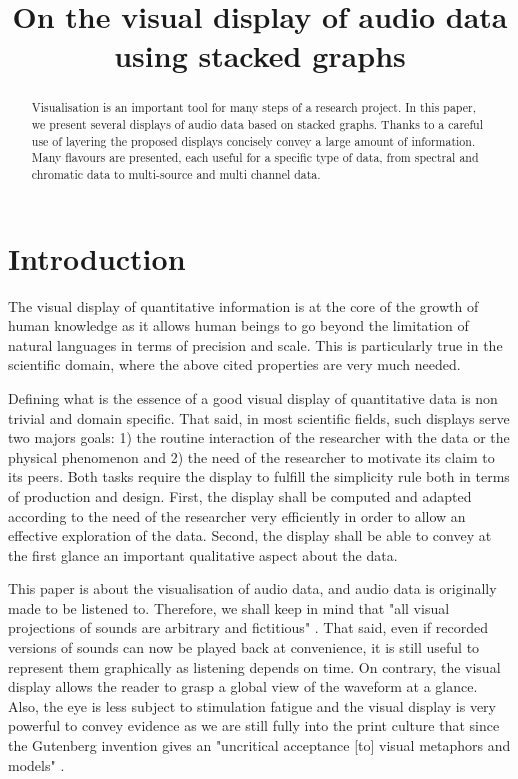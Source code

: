 \documentclass{article}
\title{On the visual display of audio data using stacked graphs}
\begin{document}
%
\maketitle
%
\begin{abstract}
Visualisation is an important tool for many steps of a research project. In this paper, we present several displays of audio data based on stacked graphs. Thanks to a careful use of layering the proposed displays concisely convey a large amount of information. Many flavours are presented, each useful for a specific type of data, from spectral and chromatic data to multi-source and multi channel data.
\end{abstract}
%
\section{Introduction}\label{sec:introduction}

The visual display of quantitative information \cite{Tufte1983} is at the core of the growth of human knowledge as it allows human beings to go beyond the limitation of natural languages in terms of precision and scale. This is particularly true in the scientific domain, where the above cited properties are very much needed.

Defining what is the essence of a good visual display of quantitative data is non trivial and domain specific. That said, in most scientific fields, such displays serve two majors goals: 1) the routine interaction of the researcher with the data or the physical phenomenon and 2) the need of the researcher to motivate its claim to its peers. Both tasks require the display to fulfill the simplicity rule both in terms of production and design. First, the display shall be computed and adapted according to the need of the researcher very efficiently in order to allow an effective exploration of the data. Second, the display shall be able to convey at the first glance an important qualitative aspect about the data.

This paper is about the visualisation of audio data, and audio data is originally made to be listened to. Therefore, we shall keep in mind that "all visual projections of sounds are arbitrary and fictitious" \cite{Schafer1977}. That said, even if recorded versions of sounds can now be played back at convenience, it is still useful to represent them graphically as listening depends on time. On contrary, the visual display allows the reader to grasp a global view of the waveform at a glance. Also, the eye is less subject to stimulation fatigue and the visual display is very powerful to convey evidence as we are still fully into the print culture that since the Gutenberg invention gives an "uncritical acceptance [to] visual metaphors and models" \cite{McLuhan1963}. %
\end{document}
